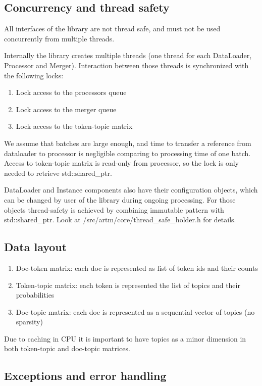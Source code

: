 \documentclass[11pt,a4paper,twoside]{report}
\begin{document}
\subsection{Concurrency and thread safety}
All interfaces of the library are not thread safe,
and must not be used concurrently from multiple threads.

Internally the library creates multiple threads
(one thread for each DataLoader, Processor and Merger).
Interaction between those threads is synchronized with the following locks:
\begin{enumerate}
    \item Lock access to the processors queue
    \item Lock access to the merger queue
    \item Lock access to the token-topic matrix
\end{enumerate}

We assume that batches are large enough,
and time to transfer a reference from dataloader to processor
is negligible comparing to processing time of one batch.
Access to token-topic matrix is read-only from processor,
so the lock is only needed to retrieve std::shared\_ptr.

DataLoader and Instance components also have their configuration objects,
which can be changed by user of the library during ongoing processing.
For those objects thread-safety is achieved by combining immutable pattern with std::shared\_ptr.
Look at /src/artm/core/thread\_safe\_holder.h for details.

\subsection{Data layout}
\begin{enumerate}
    \item Doc-token matrix: each doc is represented as list of token ids and their counts
    \item Token-topic matrix: each token is represented the list of topics and their probabilities
    \item Doc-topic matrix: each doc is represented as a sequential vector of topics (no sparsity)
\end{enumerate}

Due to caching in CPU it is important to have topics as a minor dimension in both token-topic and doc-topic matrices.

\subsection{Exceptions and error handling}
\end{document}
